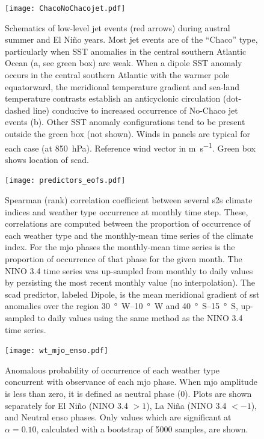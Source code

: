 \documentclass[twocol]{ametsoc}
\begin{document}
\begin{figure}
	\noindent\texttt{[image: ChacoNoChacojet.pdf]}
	\caption{
		Schematics of low-level jet events (red arrows) during austral summer and El Ni\~no years.
		Most jet events are of the ``Chaco'' type, particularly when SST anomalies in the central southern Atlantic Ocean (a, see green box) are weak.
		When a dipole SST anomaly occurs in the central southern Atlantic with the warmer pole equatorward, the meridional temperature gradient and sea-land temperature contrasts establish an anticyclonic circulation (dot-dashed line) conducive to increased occurrence of No-Chaco jet events (b).
		Other SST anomaly configurations tend to be present outside the green box (not shown).
		Winds in panels are typical for each case (at \SI{850}{\hecto\pascal}).
		Reference wind vector in \si{\meter\per\second}.
		Green box shows location of \gls{scad}.
	}\label{fig:chaco-nochaco}
\end{figure}

\begin{figure}
	\texttt{[image: predictors\_eofs.pdf]}
	\caption{
		Spearman (rank) correlation coefficient between several \gls{s2s} climate indices and weather type occurrence at monthly time step.
		These, correlations are computed between the proportion of occurrence of each weather type and the monthly-mean time series of the climate index.
		For the \gls{mjo} phases the monthly-mean time series is the proportion of occurrence of that phase for the given month.
		The NINO 3.4 time series was up-sampled from monthly to daily values by persisting the most recent monthly value (no interpolation).
		The \acrfull{scad} predictor, labeled Dipole, is the mean meridional gradient of \gls{sst} anomalies over the region \SIrange{30}{10}{\degree W} and \SIrange{40}{15}{\degree S}, up-sampled to daily values using the same method as the NINO 3.4 time series.
	}\label{fig:predictor-eof}
\end{figure}

\begin{figure}
	\texttt{[image: wt\_mjo\_enso.pdf]}
	\caption{
		Anomalous probability of occurrence of each weather type concurrent with observance of each \gls{mjo} phase. 
		When \gls{mjo} amplitude is less than zero, it is defined as neutral phase (0).
		Plots are shown separately for El Ni\~no (NINO 3.4 $>1$), La Ni\~na (NINO 3.4 $< -1$), and Neutral \gls{enso} phases.
		Only values which are significant at $\alpha=0.10$, calculated with a bootstrap of 5000 samples, are shown.
	}\label{fig:wt-mjo-enso}
\end{figure}
\end{document}
